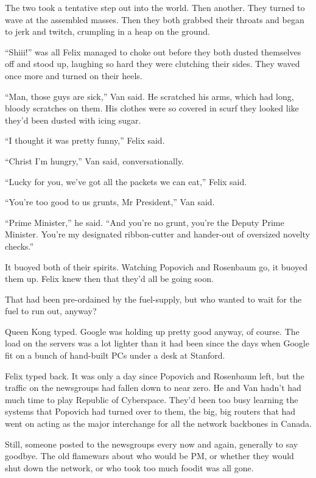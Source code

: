 The two took a tentative step out into the world. Then another.
They turned to wave at the assembled masses. Then they both grabbed
their throats and began to jerk and twitch, crumpling in a heap on
the ground.

“Shiii\dash{}!” was all Felix managed to choke out before they both
dusted themselves off and stood up, laughing so hard they were
clutching their sides. They waved once more and turned on their
heels.

“Man, those guys are sick,” Van said. He scratched his arms, which
had long, bloody scratches on them. His clothes were so covered in
scurf they looked like they’d been dusted with icing sugar.

“I thought it was pretty funny,” Felix said.

“Christ I’m hungry,” Van said, conversationally.

“Lucky for you, we’ve got all the packets we can eat,” Felix said.

“You’re too good to us grunts, Mr President,” Van said.

“Prime Minister,” he said. “And you’re no grunt, you’re the Deputy
Prime Minister. You’re my designated ribbon-cutter and hander-out
of oversized novelty checks.”

It buoyed both of their spirits. Watching Popovich and Rosenbaum
go, it buoyed them up. Felix knew then that they’d all be going
soon.

That had been pre-ordained by the fuel-supply, but who wanted to
wait for the fuel to run out, anyway?

\tb

Queen Kong typed. Google was holding up pretty good anyway, of
course. The load on the servers was a lot lighter than it had been
since the days when Google fit on a bunch of hand-built PCs under a
desk at Stanford.

Felix typed back. It was only a day since Popovich and Rosenbaum
left, but the traffic on the newsgroups had fallen down to near
zero. He and Van hadn’t had much time to play Republic of
Cyberspace. They’d been too busy learning the systems that Popovich
had turned over to them, the big, big routers that had went on
acting as the major interchange for all the network backbones in
Canada.

Still, someone posted to the newsgroups every now and again,
generally to say goodbye. The old flamewars about who would be PM,
or whether they would shut down the network, or who took too much
food\dash{}it was all gone.

